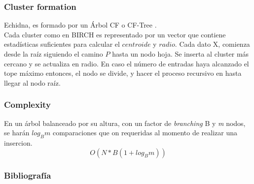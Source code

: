 \documentclass{beamer}
\begin{document}
\begin{frame}
\frametitle{Cluster formation}
Echidna, es formado por un Árbol CF o CF-Tree \cite{mahmood2006echidna}.\\
Cada cluster como en BIRCH es representado por un vector que contiene estadísticas suficientes para calcular el $centroide$ y $radio$. Cada dato X, comienza desde la raíz siguiendo el camino $P$ hasta un nodo hoja. Se inserta al cluster más cercano y se actualiza en radio. En caso el número de entradas haya alcanzado el tope máximo entonces, el nodo se divide, y hacer el proceso recursivo en hasta llegar al nodo raíz.
\end{frame}

\begin{frame}
\frametitle{Complexity}    
En un árbol balanceado por su altura, con un factor de \textit{branching} B y \textit{m} nodos, se harán $log_{B}m$ comparaciones que on requeridas al momento de realizar una insercion. 
$$O(N * B(1 + log_{B}m))$$
\end{frame}

\begin{frame}
\frametitle{Bibliografía}
\printbibliography
\end{frame}
\end{document}
